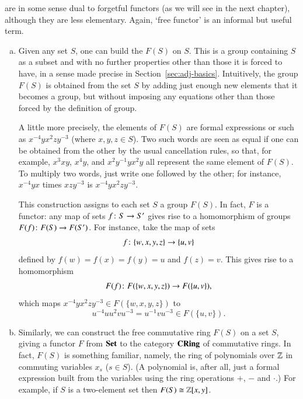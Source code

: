 \begin{examples}
\label{egs:free-functors}
 are in some sense dual to forgetful functors (as we will see in
the next chapter), although they are less elementary.  Again, `free
functor' is an informal but useful term.

\begin{enumerate}[(b)]
\item
\label{eg:free-group}
Given any set $S$, one can build the  $F(S)$ on $S$.  This is a group containing $S$ as a subset and with
no further properties other than those it is forced to have, in a sense
made precise in Section~\ref{sec:adj-basics}.  Intuitively, the group
$F(S)$ is obtained from the set $S$ by adding just enough new elements that
it becomes a group, but without imposing any equations other than those
forced by the definition of group.

A little more precisely, the elements of $F(S)$ are formal expressions or
%
%
%
such as $x^{-4} y x^2 z y^{-3}$ (where $x, y, z \in S$).  Two such words
are seen as equal if one can be obtained from the other by the usual
cancellation rules, so that, for example, $x^3 x y$, $x^4 y$, and $x^2
y^{-1} y x^2 y$ all represent the same element of $F(S)$.  To multiply two
words, just write one followed by the other; for instance, $x^{-4} y x$
times $x z y^{-3}$ is $x^{-4} y x^2 z y^{-3}$.

This construction assigns to each set $S$ a group $F(S)$.  In fact, $F$ is
a functor: any map of sets $f\from S \to S'$ gives rise to a homomorphism
of groups $F(f)\from F(S) \to F(S')$.  For instance, take the map of sets
\[
f\from \{w, x, y, z\} \to \{u, v\}
\]
defined by $f(w) = f(x) = f(y) = u$ and $f(z) = v$.  This gives rise to a
homomorphism
\[
F(f)\from F(\{w, x, y, z\}) \to F(\{u, v\}),
\]
which maps $x^{-4} y x^2 z y^{-3} \in F(\{w, x, y, z\})$ to
\[
u^{-4} u u^2 v u^{-3}
=
u^{-1} v u^{-3}
\in
F(\{u, v\}).
\]

\item
\label{eg:free-ring}
Similarly, we can construct the free commutative ring $F(S)$ on a set $S$,
giving a functor $F$ from $\mathbf{Set}$ to the category $\mathbf{CRing}$%
%
%
of commutative rings.  In fact, $F(S)$ is something familiar, namely, the
ring of polynomials%
%
%
over $\mathbb{Z}$ in commuting variables $x_s$ ($s \in S$).  (A polynomial
is, after all, just a formal expression built from the variables using
the ring operations $+$, $-$ and $\cdot$.)  For example, if $S$ is a
two-element set then $F(S) \cong \mathbb{Z}[x, y]$.


\end{enumerate}
\end{examples}
